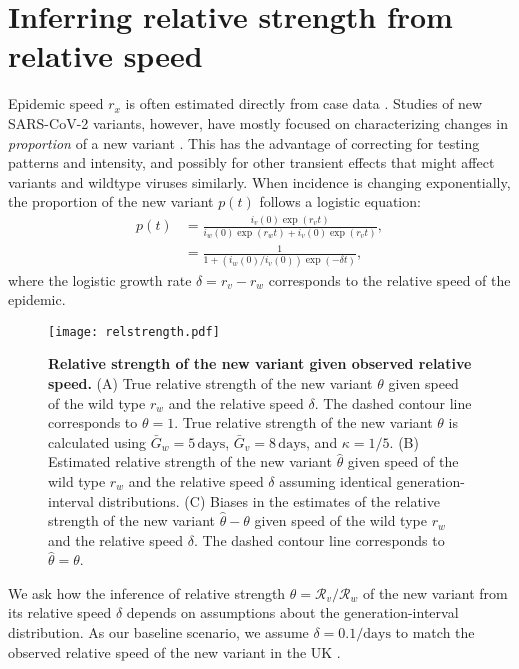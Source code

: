 \documentclass[12pt]{article}
\newcommand{\RR}{\ensuremath{{\mathcal R}}\xspace}
\begin{document}
\section{Inferring relative strength from relative speed}

Epidemic speed $r_x$ is often estimated directly from case data \citep{mills2004transmissibility,nishiura2009transmission,ma2014estimating}.
Studies of new SARS-CoV-2 variants, however, have mostly focused on characterizing changes in \emph{proportion} of a new variant \citep{switzerland2021variant, davies2021estimated, di2021impact, leung2021early, volz2021transmission,zhao2021}.
This has the advantage of correcting for testing patterns and intensity, and possibly for other transient effects that might affect variants and wildtype viruses similarly.
When incidence is changing exponentially, the proportion of the new variant $p(t)$ follows a logistic equation:
\begin{align}
p(t) &= \frac{i_v(0) \exp(r_v t)}{i_w(0) \exp(r_w t) + i_v(0) \exp(r_v t)},
\\ &= \frac{1}{1 + \left(i_w(0)/i_v(0)\right) \exp(-\delta t)},
\end{align}
where the logistic growth rate $\delta = r_v - r_w$ corresponds to the relative speed of the epidemic.

\begin{figure}[!th]
\texttt{[image: relstrength.pdf]}
\caption{
\textbf{Relative strength of the new variant given observed relative speed.}
(A) True relative strength of the new variant $\theta$ given speed of the wild type $r_w$ and the relative speed $\delta$.
The dashed contour line corresponds to $\theta = 1$.
True relative strength of the new variant $\theta$ is calculated using $\bar{G}_w = 5\,\textrm{days}$, $\bar{G}_v = 8\,\textrm{days}$, and $\kappa = 1/5$. 
(B) Estimated relative strength of the new variant $\hat{\theta}$ given speed of the wild type
$r_w$ and the relative speed $\delta$ assuming identical generation-interval distributions.
(C) Biases in the estimates of the relative strength of the new variant $\hat{\theta} - \theta$ given speed of the wild type $r_w$ and the relative speed $\delta$.
The dashed contour line corresponds to $\hat{\theta} = \theta$.
}
\label{fig:relstrength}
\end{figure}

We ask how the inference of relative strength $\theta = \RR_v/\RR_w$ of the new variant from its relative speed $\delta$ depends on assumptions about the generation-interval distribution.
As our baseline scenario, we assume $\delta = 0.1/\textrm{days}$ to match the observed relative speed of the new variant in the UK \citep{davies2021estimated}.
\end{document}
